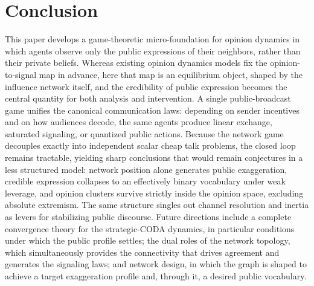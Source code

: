 \documentclass[journal,twoside,web]{ieeecolor}
\begin{document}
\section{Conclusion}
\label{sec:conclusion}
This paper develops a game-theoretic micro-foundation for opinion dynamics in which agents observe only the public expressions of their neighbors, rather than their private beliefs. Whereas existing opinion dynamics models fix the opinion-to-signal map in advance, here that map is an equilibrium object, shaped by the influence network itself, and the credibility of public expression becomes the central quantity for both analysis and intervention. A single public-broadcast game unifies the canonical communication laws: depending on sender incentives and on how audiences decode, the same agents produce linear exchange, saturated signaling, or quantized public actions. Because the network game decouples exactly into independent scalar cheap talk problems, the closed loop remains tractable, yielding sharp conclusions that would remain conjectures in a less structured model: network position alone generates public exaggeration, credible expression collapses to an effectively binary vocabulary under weak leverage, and opinion clusters survive strictly inside the opinion space, excluding absolute extremism. The same structure singles out channel resolution and inertia as levers for stabilizing public discourse. Future directions include a complete convergence theory for the strategic-CODA dynamics, in particular conditions under which the public profile settles; the dual roles of the network topology, which simultaneously provides the connectivity that drives agreement and generates the signaling laws; and network design, in which the graph is shaped to achieve a target exaggeration profile and, through it, a desired public vocabulary.

\appendix
\end{document}
